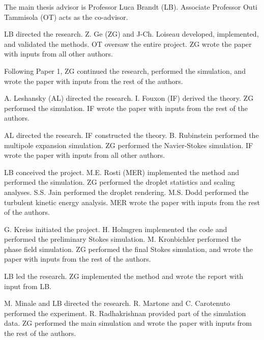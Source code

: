 \begin{divisionofwork}
	The main thesis advisor is Professor Luca Brandt (LB).
	Associate Professor Outi Tammisola (OT) acts as the co-advisor.

        \bigskip

	\paperitem
                LB directed the research.
                Z. Ge (ZG) and J-Ch. Loiseau developed, implemented, and validated the methods.
                OT oversaw the entire project.
		ZG wrote the paper with inputs from all other authors.

	\paperitem
                Following Paper 1, ZG continued the research, performed the simulation,
                and wrote the paper with inputs from the rest of the authors.

	\paperitem
                A. Leshansky (AL) directed the research.
                I. Fouxon (IF) derived the theory.
		ZG performed the simulation.
                IF wrote the paper with inputs from the rest of the authors.

	\paperitem
                AL directed the research.
                IF constructed the theory.
		B. Rubinstein performed the multipole expansion simulation.
                ZG performed the Navier-Stokes simulation.
                IF wrote the paper with inputs from all other authors.

	\paperitem
                LB conceived the project.
                M.E. Rosti (MER) implemented the method and performed the simulation.
		ZG performed the droplet statistics and scaling analyses.
                S.S. Jain performed the droplet rendering.
                M.S. Dodd performed the turbulent kinetic energy analysis.
                MER wrote the paper with inputs from the rest of the authors.

	\paperitem
                G. Kreiss initiated the project.
                H. Holmgren implemented the code and performed the preliminary Stokes simulation.
                M. Kronbichler performed the phase field simulation.
		ZG performed the final Stokes simulation, and 
                wrote the paper with inputs from the rest of the authors.

	\paperitem
                LB led the research.
		ZG implemented the method and wrote the report with input from LB.

	\paperitem
                M. Minale and LB directed the research.
                R. Martone and C. Carotenuto performed the experiment.
                R. Radhakrishnan provided part of the simulation data.
		ZG performed the main simulation and wrote the paper with inputs from the rest of the authors.

               

\end{divisionofwork}


